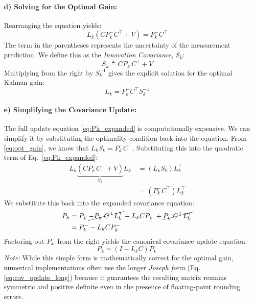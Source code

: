 \paragraph{d) Solving for the Optimal Gain:}
Rearranging the equation yields:
\begin{equation*}
	L_k (C P_k^- C^\top + V) = P_k^- C^\top
\end{equation*}
The term in the parentheses represents the uncertainty of the measurement prediction. We define this as the \emph{Innovation Covariance}, $S_k$:
\begin{equation*}
	S_k \triangleq C P_k^- C^\top + V
\end{equation*}
Multiplying from the right by $S_k^{-1}$ gives the explicit solution for the optimal Kalman gain:
\begin{equation} \label{eq:opt_gain}
	{ L_k = P_k^- C^\top S_k^{-1} }
\end{equation}

\paragraph{e) Simplifying the Covariance Update:}
The full update equation \eqref{eq:Pk_expanded} is computationally expensive. We can simplify it by substituting the optimality condition back into the equation.
From \eqref{eq:opt_gain}, we know that $L_k S_k = P_k^- C^\top $.
Substituting this into the quadratic term of Eq.~\eqref{eq:Pk_expanded}:
\begin{align*}
	L_k \underbrace{(C P_k^- C^\top  + V)}_{S_k} L_k^\top  &= (L_k S_k) L_k^\top  \nonumber \\
	&= (P_k^- C^\top ) L_k^\top 
\end{align*}
We substitute this back into the expanded covariance equation:
\begin{align*}
	P_k &= P_k^- \cancel{- P_k^- C^\top  L_k^\top } - L_k C P_k^- + \cancel{P_k^- C^\top  L_k^\top } \nonumber \\
	 &= P_k^- - L_k C P_k^-
\end{align*}
Factoring out $P_k^-$ from the right yields the canonical covariance update equation:
\begin{equation*}
	{ P_k = (I - L_k C) P_k^- }
\end{equation*}
\textit{Note:} While this simple form is mathematically correct for the optimal gain, numerical implementations often use the longer \emph{Joseph form} (Eq. \ref{eq:cov_update_long}) because it guarantees the resulting matrix remains symmetric and positive definite even in the presence of floating-point rounding errors.

